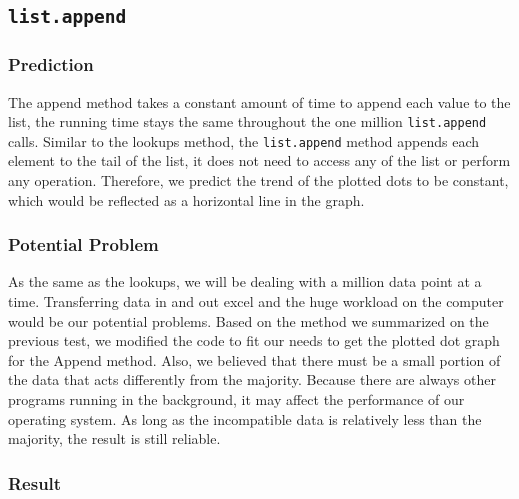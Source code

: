 \documentclass[titlepage, 12pt]{article}
\begin{document}
\subsection{\texttt{list.append}}

\subsubsection{Prediction}

The append method takes a constant amount of time to append each value to the
list, the running time stays the same throughout the one million
\texttt{list.append} calls. Similar to the lookups method, the
\texttt{list.append} method appends each element to the tail of the list, it
does not need to access any of the list or perform any operation. Therefore, we
predict the trend of the plotted dots to be constant, which would be reflected
as a horizontal line in the graph.

\subsubsection{Potential Problem}

As the same as the lookups, we will be dealing with a million data point at a
time. Transferring data in and out excel and the huge workload on the computer
would be our potential problems. Based on the method we summarized on the
previous test, we modified the code to fit our needs to get the plotted dot
graph for the Append method. Also, we believed that there must be a small
portion of the data that acts differently from the majority. Because there are
always other programs running in the background, it may affect the performance
of our operating system. As long as the incompatible data is relatively less
than the majority, the result is still reliable.

\subsubsection{Result}
\end{document}
